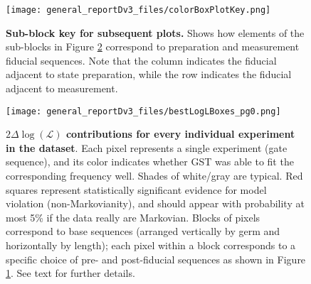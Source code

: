 \documentclass{article}[11pt]
\begin{document}
{\begin{figure}
\begin{center}
\texttt{[image: general\_reportDv3\_files/colorBoxPlotKey.png]}
\caption{\textbf{Sub-block key for subsequent plots.} Shows how elements of the sub-blocks in Figure \ref{bestEstimateColorBoxPlot} correspond to preparation and measurement fiducial sequences.  Note that the column indicates the fiducial adjacent to state preparation, while the row indicates the fiducial adjacent to measurement.\label{colorBoxPlotKeyPlot}}
\end{center}
\end{figure}


\begin{figure}
\begin{center}
\texttt{[image: general\_reportDv3\_files/bestLogLBoxes\_pg0.png]}
\caption{\textbf{$2\Delta\log(\mathcal{L})$ contributions for every individual experiment in the dataset}.   Each pixel represents a single experiment (gate sequence), and its color indicates whether GST was able to fit the corresponding frequency well.  Shades of white/gray are typical. Red squares represent statistically significant evidence for model violation (non-Markovianity), and should appear with probability at most 5\% if the data really are Markovian. Blocks of pixels correspond to base sequences (arranged vertically by germ and horizontally by length); each pixel within a block corresponds to a specific choice of pre- and post-fiducial sequences as shown in Figure \ref{colorBoxPlotKeyPlot}.  See text for further details.\label{bestEstimateColorBoxPlot}}
\end{center}
\end{figure}

}
\end{document}
